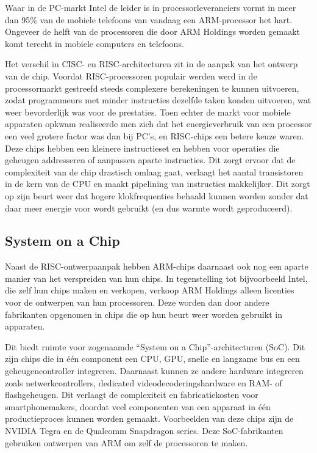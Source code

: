 Waar in de PC-markt Intel de leider is in processorleveranciers vormt in meer dan 95\% van de mobiele telefoons van vandaag een ARM-processor het hart. Ongeveer de helft van de processoren die door ARM Holdings worden gemaakt komt terecht in mobiele computers en telefoons. \citep{economistarm}

Het verschil in CISC- en RISC-architecturen zit in de aanpak van het ontwerp van de chip.
Voordat RISC-processoren populair werden werd in de processormarkt gestreefd steeds complexere berekeningen te kunnen uitvoeren, zodat programmeurs met minder instructies dezelfde taken konden uitvoeren, wat weer bevorderlijk was voor de prestaties.
Toen echter de markt voor mobiele apparaten opkwam realiseerde men zich dat het energieverbruik van een processor een veel grotere factor was dan bij PC's, en RISC-chips een betere keuze waren.
Deze chips hebben een kleinere instructieset en hebben voor operaties die geheugen addresseren of aanpassen aparte instructies. 
Dit zorgt ervoor dat de complexiteit van de chip drastisch omlaag gaat, verlaagt het aantal transistoren in de kern van de CPU en maakt pipelining van instructies makkelijker.
Dit zorgt op zijn beurt weer dat hogere klokfrequenties behaald kunnen worden zonder dat daar meer energie voor wordt gebruikt (en dus warmte wordt geproduceerd). \citep{stanfordrisc}

\subsection{System on a Chip}

Naast de RISC-ontwerpaanpak hebben ARM-chips daarnaast ook nog een aparte manier van het verspreiden van hun chips.
In tegenstelling tot bijvoorbeeld Intel, die zelf hun chips maken en verkopen, verkoop ARM Holdings alleen licenties voor de ontwerpen van hun processoren.
Deze worden dan door andere fabrikanten opgenomen in chips die op hun beurt weer worden gebruikt in apparaten.

Dit biedt ruimte voor zogenaamde ``System on a Chip''-architecturen (SoC).
Dit zijn chips die in \'e\'en component een CPU, GPU, snelle en langzame bus en een geheugencontroller integreren.
Daarnaast kunnen ze andere hardware integreren zoals netwerkcontrollers, dedicated videodecoderingshardware en RAM- of flashgeheugen.
Dit verlaagt de complexiteit en fabricatiekosten voor smartphonemakers, doordat veel componenten van een apparaat in \'e\'en productieproces kunnen worden gemaakt.
Voorbeelden van deze chips zijn de NVIDIA Tegra en de Qualcomm Snapdragon series.
Deze SoC-fabrikanten gebruiken ontwerpen van ARM om zelf de processoren te maken.

